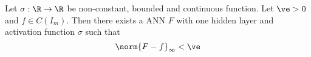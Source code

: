 

\begin{thm}
	Let $\sigma: \R \to \R$ be non-constant, bounded and continuous function.
	Let $\ve > 0$ and $f \in C(I_m)$.
	Then there exists a ANN $F$ with one hidden layer
	and activation function $\sigma$ such that
	\[ \norm{F - f}_\infty < \ve \]
\end{thm}
